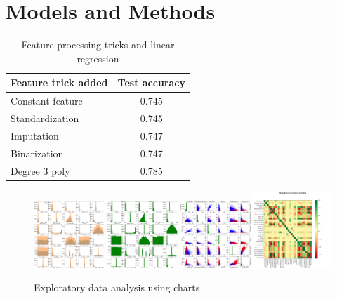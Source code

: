 \documentclass[10pt,conference,compsocconf]{IEEEtran}
\begin{document}
\section{Models and Methods}
\begin{table}[!htb]
	\caption{Feature processing tricks and linear regression}	\label{tab:feature_proc}
	\centering\begin{tabular}{|lc|}\hline
		{\bf Feature trick added} & {\bf Test accuracy}\\\hline
		Constant feature & 0.745\\
		Standardization & 0.745\\
		Imputation & 0.747\\
		Binarization & 0.747\\
		Degree 3 poly & 0.785\\\hline
	\end{tabular}
\end{table}

\begin{figure}[!htb]
	\centering \includegraphics[width=100px]{../src/analysis/xy_tr_imp}
	\centering \includegraphics[width=100px]{../src/analysis/hist_te_imp}
	\centering \includegraphics[width=100px]{../src/analysis/hist-scatter-tr-imp-0}
	\centering \includegraphics[width=110px]{../src/analysis/correlation}
	\caption{Exploratory data analysis using charts}
	\label{fig:data}
\end{figure}
\end{document}
